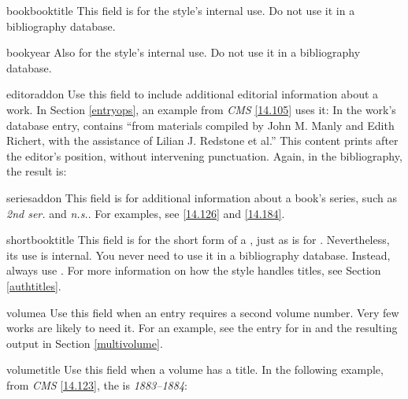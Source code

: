 \documentclass[11pt,letterpaper,oneside]{article}
\begin{document}
\begin{marglist}

\item[bookbooktitle] This field is for the style's internal use. Do
not use it in a bibliography database.

\item[bookyear] Also for the style's internal use. Do not use it in a
bibliography database.

\item[editoraddon] Use this field to include additional editorial
information about a work. In Section \ref{entryops}, an example from
\textit{CMS} \ref{14.105} uses it: In the work's database entry,
 contains ``from materials compiled by John M.
Manly and Edith Richert, with the assistance of Lilian J. Redstone et
al.'' This content prints after the editor's position, without
intervening punctuation. Again, in the bibliography, the result is:

\begin{bibonly}
\nocite{chaucer1966}
\end{bibonly}

\item[seriesaddon] This field is for additional information about a
book's series, such as \textit{2nd ser.} and \textit{n.s.}. For
examples, see \ref{14.126} and \ref{14.184}.

\item[shortbooktitle] This field is for the short form of a
, just as  is for
. Nevertheless, its use is internal. You never need to
use it in a bibliography database. Instead, always use
. For more information on how the style handles
titles, see Section \ref{authtitles}.

\item[volumea] Use this field when an entry requires a second volume
number. Very few works are likely to need it. For an example, see the
entry for  in  and the
resulting output in Section \ref{multivolume}.

\item[volumetitle] Use this field when a volume has a title. In the
following example, from \textit{CMS} \ref{14.123}, the
 is \textit{1883--1884}:

\begin{citeonly}
\item \cite*[32--33]{james1963.5}
\end{citeonly}

\end{marglist}
\end{document}
